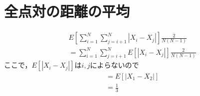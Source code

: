 \section{全点対の距離の平均}
\begin{align*}
  &E\left[\sum_{i=1}^N \sum_{j=i+1}^N | X_i - X_j | \right] \frac{2}{N(N-1)}\\
  &= \sum_{i=1}^N \sum_{j=i+1}^N E\left[|X_i - X_j|\right] \frac{2}{N(N-1)}
\end{align*}
ここで，$E\left[|X_i-X_j|\right]$は$i,j$によらないので
\begin{align*}
  &= E[|X_1 - X_2|] \\
  &= \frac13
\end{align*}
